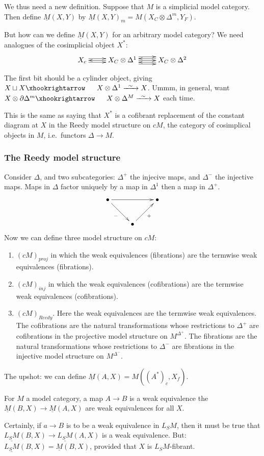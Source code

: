 \documentclass[11pt]{article}
\begin{document}
\begin{AlexandreBausfieldLocalisation}
\begin{PartOne}
We thus need a new definition. Suppose that $M$ is a simplicial model category. Then define $\underline M(X,Y)$ by $\underline M(X,Y)_m=M(X_C\otimes\Delta^m,Y_F)$. 

But how can we define $\underline M(X,Y)$ for an arbitrary model category? We need analogues of the cosimplicial object $X^*$:
\[\xymatrix{X_c\ar@<.6ex>[r]\ar@<-.6ex>[r]&\ar[l] X_C\otimes\Delta^1
\ar[r]\ar@<1.2ex>[r]\ar@<-1.2ex>[r]&
\ar@<.6ex>[l]\ar@<-.6ex>[l]X_C\otimes\Delta^2
}\]

The first bit should be a cylinder object, giving $X\sqcup X\cofibration X\otimes \Delta^1\weakequiv X$. Ummm, in general, want $X\otimes\partial \Delta^m\cofibration X\otimes\Delta^M\weakequiv X$ each time.

This is the same as saying that $X^*$ is a cofibrant replacement of the constant diagram at $X$ in the Reedy model structure on $cM$, the category of cosimplical objects in $M$, i.e.\ functors $\Delta\to M$.
\subsubsection*{The Reedy model structure}
Consider $\Delta$, and two subcategories: $\Delta^+$ the injecive maps, and $\Delta^-$ the injective maps. Maps in $\Delta$ factor uniquely by a map in $\Delta^1$ then a map in $\Delta^+$.
\[\xymatrix{
\Bullet\ar[rr]\ar[rd]_{-}&&\Bullet\\
&\Bullet\ar[ru]_{+}
}\]
Now we can define three model structure on $cM$:
\begin{enumerate}
\item $(cM)_{proj}$ in which the weak equivalences (fibrations) are the termwise weak equivalences (fibrations).
\item $(cM)_{inj}$ in which the weak equivalences (cofibrations) are the termwise weak equivalences (cofibrations).
\item $(cM)_{Reedy}$. Here the weak equivalences are the termwise weak equivalences. The cofibrations are the natural transformations whose restrictions to $\Delta^+$ are cofibrations in the projective model structure on $M^{\Delta^+}$. The fibrations are the natural transformations whose restrictions to $\Delta^-$ are fibrations in the injective model structure on $M^{\Delta^-}$. 
\end{enumerate}
\end{PartOne}
\begin{PartTwo}
The upshot: we can define $\underline M(A,X)=M((A^*)_c,X_f)$.
\begin{prop*}
For $M$ a model category, a map $A\to B$ is a weak equivalence \Iff the $\underline M(B,X)\to\underline M(A,X)$ are weak equivalences for all $X$.
\end{prop*}
Certainly, if $a\to B$ is to be a weak equivalence in $L_SM$, then it must be true that $\underline{L_SM}(B,X)\to\underline{L_SM}(A,X)$ is a weak equivalence. But:
$\underline{L_SM}(B,X)=\underline M(B,X)$, provided that $X$ is $L_SM$-fibrant.

\end{PartTwo}
\end{AlexandreBausfieldLocalisation}
\end{document}
